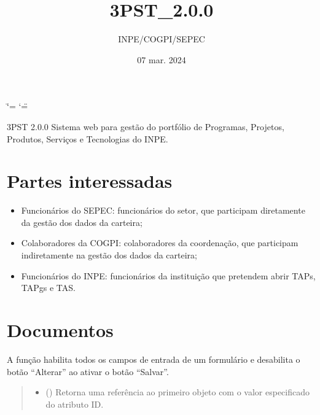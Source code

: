 \documentclass[letterpaper,10pt,brazil]{sphinxmanual}
\title{3PST\_2.0.0}
\date{07 mar. 2024}
\author{INPE/COGPI/SEPEC}
\begin{document}
\ifdefined\shorthandoff
  \ifnum\catcode`\=\string=\active\shorthandoff{=}\fi
  \ifnum\catcode`\"=\active{}\fi
\fi

\pagestyle{empty}
\sphinxmaketitle
\pagestyle{plain}
\sphinxtableofcontents
\pagestyle{normal}
\label{\detokenize{index::doc}}



\sphinxAtStartPar
3PST 2.0.0 \textendash{} Sistema web para gestão do portfólio de
Programas, Projetos, Produtos, Serviços e Tecnologias do INPE.


\chapter{Partes interessadas}
\label{\detokenize{index:partes-interessadas}}\begin{itemize}
\item {} 
\sphinxAtStartPar
Funcionários do SEPEC: funcionários do setor, que participam diretamente da gestão dos dados da carteira;

\item {} 
\sphinxAtStartPar
Colaboradores da COGPI: colaboradores da coordenação, que participam indiretamente na gestão dos dados da carteira;

\item {} 
\sphinxAtStartPar
Funcionários do INPE: funcionários da instituição que pretendem abrir TAPs, TAPgs e TAS.

\end{itemize}


\chapter{Documentos}
\label{\detokenize{index:documentos}}

\begin{fulllineitems}
\label{\detokenize{index:habilitarInput}}
\pysigstartsignatures
{}
\pysigstopsignatures
\sphinxAtStartPar
A função  habilita todos os campos de entrada de um formulário e
desabilita o botão “Alterar” ao ativar o botão “Salvar”.
\begin{quote}\begin{description}
\begin{itemize}
\item {} 
\sphinxAtStartPar
{} () \textendash{} Retorna uma referência ao primeiro objeto com o valor especificado do atributo ID.

\end{itemize}

\end{description}\end{quote}

\end{fulllineitems}
\end{document}
